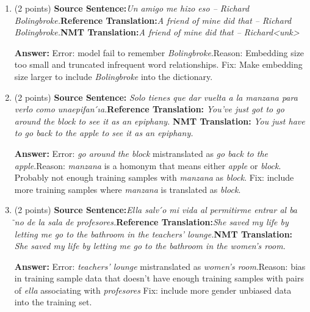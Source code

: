 \documentclass{article}
\begin{document}
\begin{enumerate}[i]
        \item (2 points) \textbf{Source Sentence:}\textit{Un amigo me hizo eso – Richard Bolingbroke.}\newline\textbf{Reference Translation:}\textit{A friend of mine did that – Richard Bolingbroke.}\newline \textbf{NMT Translation:}\textit{A friend of mine did that – Richard<unk>}
        
        \textbf{Answer:} \newline Error: model fail to remember \textit{Bolingbroke}.\newline Reason: Embedding size too small and truncated infrequent word relationships. \newline Fix: Make embedding size larger to include \textit{Bolingbroke} into the dictionary.
        
        \item (2 points) \textbf{Source Sentence:} \textit{Solo  tienes  que  dar  vuelta  a  la  manzana  para  verlo  como  unaepifan ́ıa.}\newline \textbf{Reference Translation:} \textit{You’ve just got to go around the block to see it as an epiphany.} \newline \textbf{NMT Translation:} \textit{You just have to go back to the apple to see it as an epiphany.}
        
        \textbf{Answer:} \newline Error: \textit{go around the block} mistranslated as \textit{go back to the apple}.\newline Reason: \textit{manzana}  is a homonym that means either \textit{apple} or \textit{block}. Probably not enough training samples with \textit{manzana} as \textit{block}. \newline Fix: include more training samples where \textit{manzana} is translated as \textit{block}.
        
        \item (2 points) \textbf{Source Sentence:}\textit{Ella  salv ́o  mi  vida  al  permitirme  entrar  al  ba ̃no  de  la  sala  de profesores.}\newline \textbf{Reference Translation:}\textit{She saved my life by letting me go to the bathroom in the teachers’ lounge.}\newline \textbf{NMT Translation:} \textit{She saved my life by letting me go to the bathroom in the women’s room.}
        
        \textbf{Answer:} \newline Error: \textit{teachers' lounge} mistranslated as \textit{women's room}.\newline Reason: bias in training sample data that doesn't have enough training samples with pairs of \textit{ella} associating with \textit{profesores} \newline Fix: include more gender unbiased data into the training set.
        

\end{enumerate}
\end{document}
